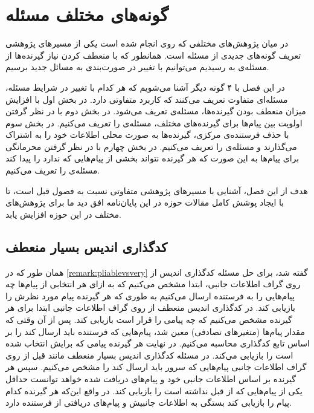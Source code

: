 
\chapter{گونه‌های مختلف مسئله}
\label{chapter:varients}
در میان پژوهش‌های مختلفی که روی 
\picod
انجام شده است یکی از مسیرهای پژوهشی تعریف گونه‌های جدیدی از مسئله است. همانطور که با منعطف کردن نیاز گیرنده‌ها از مسئله‌ی
\icod
به
\picod
رسیدیم می‌توانیم با تغییر در صورت‌بندی
\picod
به مسائل جدید برسیم.

در این فصل با ۴ گونه دیگر آشنا می‌شویم که هر کدام با تغییر در شرایط مسئله، مسئله‌ای متفاوت تعریف می‌کنند که کاربرد متفاوتی دارد. در بخش اول با افزایش میزان منعطف بودن گیرنده‌ها، مسئله‌ی 
 تعریف می‌شود. در بخش دوم با در نظر گرفتن اولویت بین پیام‌ها برای گیرنده‌های مختلف، مسئله‌ی
 را تعریف می‌کنیم. در بخش سوم با حذف فرستنده‌ی مرکزی، گیرنده‌ها به صورت محلی اطلاعات خود را به اشتراک می‌گذارند و مسئله‌ی
 را تعریف می‌کنیم. در بخش چهارم با در نظر گرفتن محرمانگی برای پیام‌ها به این صورت که هر گیرنده نتواند بخشی از پیام‌هایی که ندارد را پیدا کند مسئله‌ی
 را تعریف می‌کنیم.
 
 هدف از این فصل، آشنایی با مسیرهای پژوهشی متفاوتی نسبت به فصول قبل است، تا با ایجاد پوشش کامل مقالات حوزه
 \picod
 در این پایان‌نامه افق دید ما برای پژوهش‌های مختلف در این حوزه افزایش یابد.
 \pagebreak
\section{کدگذاری اندیس بسیار منعطف}
\label{sec:verypliable}
همان طور که در
\autoref{remark:pliablevsvery}
گفته شد، برای حل مسئله کدگذاری اندیس از روی گراف اطلاعات جانبی، ابتدا مشخص می‌کنیم که به ازای هر انتخابی از پیام‌ها چه پیام‌هایی را به فرستنده ارسال می‌کنیم به طوری که هر گیرنده پیام مورد نظرش را بازیابی کند. در کدگذاری اندیس منعطف از روی گراف اطلاعات جانبی ابتدا برای هر گیرنده مشخص می‌کنیم که چه پیامی را قرار است بازیابی کند.
پس از آن وقتی که مقدار پیام‌ها (متغیرهای تصادفی) معین شد، پیام‌هایی که فرستنده باید ارسال کند را بر اساس تابع کدگذاری محاسبه می‌کنیم. در نهایت هر گیرنده پیامی که برایش انتخاب شده است را بازیابی می‌کند.
در مسئله کدگذاری اندیس بسیار منعطف مانند قبل از روی گراف اطلاعات جانبی پیام‌هایی که سرور باید ارسال کند را مشخص می‌کنیم. سپس هر گیرنده بر اساس اطلاعات جانبی خود و پیام‌های دریافت شده خواهد توانست حداقل یکی از پیام‌هایی که از قبل نداشته است را بازیابی کند. در واقع این‌که هر گیرنده کدام پیام را بازیابی کند بستگی به اطلاعات جانبیش و پیام‌های دریافتی از فرستنده دارد.


